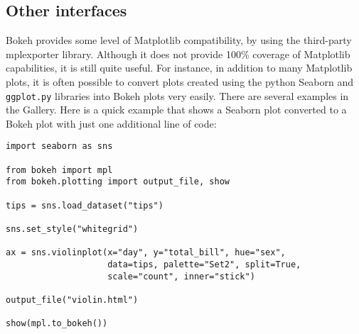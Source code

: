 \documentclass[a4paper,12pt]{article}
\begin{document}
\subsection{Other interfaces}
Bokeh provides some level of Matplotlib compatibility, by using the third-party mplexporter library. Although it does not provide 100\% coverage of Matplotlib capabilities, it is still quite useful. For instance, in addition to many Matplotlib plots, it is often possible to convert plots created using the python Seaborn and \texttt{ggplot.py} libraries into Bokeh plots very easily. There are several examples in the Gallery. Here is a quick example that shows a Seaborn plot converted to a Bokeh plot with just one additional line of code:

\begin{framed}
	\begin{verbatim}
import seaborn as sns

from bokeh import mpl
from bokeh.plotting import output_file, show

tips = sns.load_dataset("tips")

sns.set_style("whitegrid")

ax = sns.violinplot(x="day", y="total_bill", hue="sex",
                    data=tips, palette="Set2", split=True,
                    scale="count", inner="stick")

output_file("violin.html")

show(mpl.to_bokeh())
	
\end{verbatim}
\end{framed}
\end{document}
